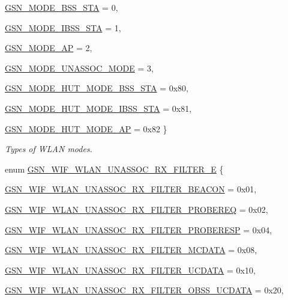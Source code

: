 \begin{DoxyCompactItemize}
\hyperlink{a00640_gga8d2c2dc6c9f7927c5cf4634d7b403b95a7b846af0882a2e9fdd177f290b02a6a1}{GSN\_\-MODE\_\-BSS\_\-STA} =  0, 
\par
\hyperlink{a00640_gga8d2c2dc6c9f7927c5cf4634d7b403b95ada8c3c5dcc25a633515f39d0622ed38a}{GSN\_\-MODE\_\-IBSS\_\-STA} =  1, 
\par
\hyperlink{a00640_gga8d2c2dc6c9f7927c5cf4634d7b403b95a67277979d811dae8f619f13ae651e957}{GSN\_\-MODE\_\-AP} =  2, 
\par
\hyperlink{a00640_gga8d2c2dc6c9f7927c5cf4634d7b403b95a2b9ddf1d3ec73ebec39439826d471cce}{GSN\_\-MODE\_\-UNASSOC\_\-MODE} =  3, 
\par
\hyperlink{a00640_gga8d2c2dc6c9f7927c5cf4634d7b403b95a2dfea59dcf8f2cc5cf5563dd98062949}{GSN\_\-MODE\_\-HUT\_\-MODE\_\-BSS\_\-STA} =  0x80, 
\par
\hyperlink{a00640_gga8d2c2dc6c9f7927c5cf4634d7b403b95a5c1af84ee44deddd78424d6649351d5c}{GSN\_\-MODE\_\-HUT\_\-MODE\_\-IBSS\_\-STA} =  0x81, 
\par
\hyperlink{a00640_gga8d2c2dc6c9f7927c5cf4634d7b403b95ad385a9345a8b96725314fefa76e307ad}{GSN\_\-MODE\_\-HUT\_\-MODE\_\-AP} =  0x82
 \}
\begin{DoxyCompactList}\small\item\em Types of WLAN modes. \end{DoxyCompactList}\item 
enum \hyperlink{a00677_gaca8dae165f1024726492234d64d1bb26}{GSN\_\-WIF\_\-WLAN\_\-UNASSOC\_\-RX\_\-FILTER\_\-E} \{ \par
\hyperlink{a00677_gaca8dae165f1024726492234d64d1bb26a508860aba80550da910c89a17ff6670f}{GSN\_\-WIF\_\-WLAN\_\-UNASSOC\_\-RX\_\-FILTER\_\-BEACON} = 0x01, 
\par
\hyperlink{a00677_gaca8dae165f1024726492234d64d1bb26aae40247fb2bf5be904c7f8935850e7ca}{GSN\_\-WIF\_\-WLAN\_\-UNASSOC\_\-RX\_\-FILTER\_\-PROBEREQ} = 0x02, 
\par
\hyperlink{a00677_gaca8dae165f1024726492234d64d1bb26a37446aa1d6147d7d37dedd056cd821ff}{GSN\_\-WIF\_\-WLAN\_\-UNASSOC\_\-RX\_\-FILTER\_\-PROBERESP} = 0x04, 
\par
\hyperlink{a00677_gaca8dae165f1024726492234d64d1bb26a3249da7fef3a050b53653a55e1fd38de}{GSN\_\-WIF\_\-WLAN\_\-UNASSOC\_\-RX\_\-FILTER\_\-MCDATA} = 0x08, 
\par
\hyperlink{a00677_gaca8dae165f1024726492234d64d1bb26a19ed4b07a7c985ec19ad9a53062526e2}{GSN\_\-WIF\_\-WLAN\_\-UNASSOC\_\-RX\_\-FILTER\_\-UCDATA} = 0x10, 
\par
\hyperlink{a00677_gaca8dae165f1024726492234d64d1bb26a6479db92f4f370cbb2068926d8de1e3e}{GSN\_\-WIF\_\-WLAN\_\-UNASSOC\_\-RX\_\-FILTER\_\-OBSS\_\-UCDATA} = 0x20, 

\end{DoxyCompactItemize}
